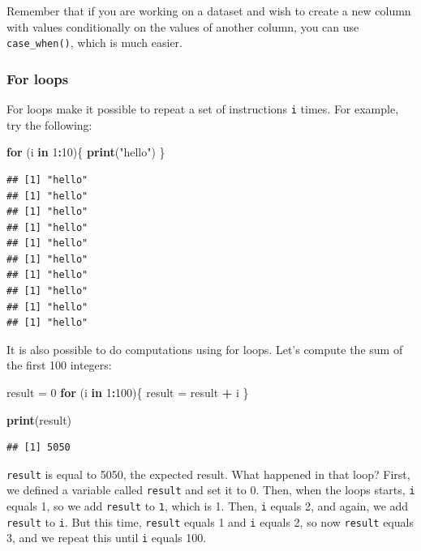 \documentclass[]{gitbook}
\newenvironment{Shaded}{\begin{snugshade}}{\end{snugshade}}
\newcommand{\ControlFlowTok}[1]{\textcolor[rgb]{0.13,0.29,0.53}{\textbf{#1}}}
\newcommand{\DecValTok}[1]{\textcolor[rgb]{0.00,0.00,0.81}{#1}}
\newcommand{\KeywordTok}[1]{\textcolor[rgb]{0.13,0.29,0.53}{\textbf{#1}}}
\newcommand{\NormalTok}[1]{#1}
\newcommand{\OperatorTok}[1]{\textcolor[rgb]{0.81,0.36,0.00}{\textbf{#1}}}
\newcommand{\StringTok}[1]{\textcolor[rgb]{0.31,0.60,0.02}{#1}}
\theoremstyle{definition}
\theoremstyle{definition}
\theoremstyle{definition}
\theoremstyle{remark}
\begin{document}
Remember that if you are working on a dataset and wish to create a new
column with values conditionally on the values of another column, you
can use \texttt{case\_when()}, which is much easier.

\hypertarget{for-loops}{%
\subsubsection{For loops}\label{for-loops}}

For loops make it possible to repeat a set of instructions \texttt{i}
times. For example, try the following:

\begin{Shaded}
\begin{Highlighting}[]
\ControlFlowTok{for}\NormalTok{ (i }\ControlFlowTok{in} \DecValTok{1}\OperatorTok{:}\DecValTok{10}\NormalTok{)\{}
  \KeywordTok{print}\NormalTok{(}\StringTok{"hello"}\NormalTok{)}
\NormalTok{\}}
\end{Highlighting}
\end{Shaded}

\begin{verbatim}
## [1] "hello"
## [1] "hello"
## [1] "hello"
## [1] "hello"
## [1] "hello"
## [1] "hello"
## [1] "hello"
## [1] "hello"
## [1] "hello"
## [1] "hello"
\end{verbatim}

It is also possible to do computations using for loops. Let's compute
the sum of the first 100 integers:

\begin{Shaded}
\begin{Highlighting}[]
\NormalTok{result =}\StringTok{ }\DecValTok{0}
\ControlFlowTok{for}\NormalTok{ (i }\ControlFlowTok{in} \DecValTok{1}\OperatorTok{:}\DecValTok{100}\NormalTok{)\{}
\NormalTok{  result =}\StringTok{ }\NormalTok{result }\OperatorTok{+}\StringTok{ }\NormalTok{i}
\NormalTok{\}}

\KeywordTok{print}\NormalTok{(result)}
\end{Highlighting}
\end{Shaded}

\begin{verbatim}
## [1] 5050
\end{verbatim}

\texttt{result} is equal to 5050, the expected result. What happened in
that loop? First, we defined a variable called \texttt{result} and set
it to 0. Then, when the loops starts, \texttt{i} equals 1, so we add
\texttt{result} to \texttt{1}, which is 1. Then, \texttt{i} equals 2,
and again, we add \texttt{result} to \texttt{i}. But this time,
\texttt{result} equals 1 and \texttt{i} equals 2, so now \texttt{result}
equals 3, and we repeat this until \texttt{i} equals 100.
\end{document}
